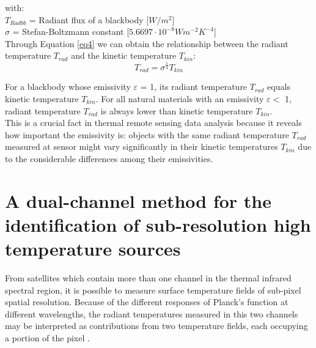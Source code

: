 \noindent with:\\
\indent $T_{Radbb}$ = Radiant flux of a blackbody [$W/m^2$]\\
\indent $\sigma$ = Stefan-Boltzmann constant [$5.6697 \cdot 10^{-8} W m^{-2} K^{-4}$]\\

\noindent Through Equation \eqref{eq4} we can obtain the relationship between the radiant temperature $T_{rad}$ and the kinetic temperature $T_{kin}$:\\
\begin{equation}
\label{eq5}
T_{rad} = \sigma ^{\frac{1}{4}} T_{kin}
\end{equation}

\noindent For a blackbody whose emissivity $\varepsilon$ = 1, its radiant temperature $T_{rad}$ equals kinetic temperature $T_{kin}$. For all natural materials with an emissivity $\varepsilon <$ 1, radiant temperature $T_{rad}$ is always lower than kinetic temperature $T_{kin}$.\\

\noindent This is a crucial fact in thermal remote sensing data analysis because it reveals how important the emissivity is: objects with the same radiant temperature $T_{rad}$ measured at sensor might vary significantly in their kinetic temperatures $T_{kin}$ due to the considerable differences among their emissivities.\\


\section{A dual-channel method for the identification of sub-resolution high temperature sources}
From satellites which contain more than one channel in the thermal infrared spectral region, it is possible to measure surface temperature fields of sub-pixel spatial resolution. Because of the different responses of Planck's function at different wavelengths, the radiant temperatures measured in this two channels may be interpreted as contributions from two temperature fields, each occupying a portion of the pixel \parencite{Reference210, Reference211}.\\

